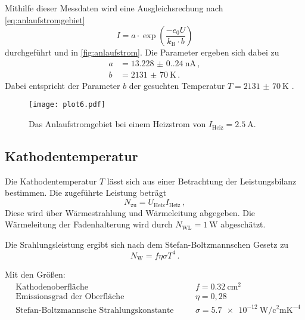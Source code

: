 Mithilfe dieser Messdaten wird eine Ausgleichsrechung nach \autoref{eq:anlaufstromgebiet}
\begin{equation}
  I=a \cdot \exp \left(\frac{-e_{0} U}{k_{\text{B}} \cdot b}\right)
\end{equation}
durchgeführt und in \autoref{fig:anlaufstrom}. Die Parameter ergeben sich dabei zu
\begin{align*}
  a &= \qty{13.228(0.240)}{\nano\ampere} \, , \\
  b &= \qty{2131(70)}{\kelvin} \, . 
\end{align*}
Dabei entspricht der Parameter $b$ der gesuchten Temperatur $T = \qty{2131(70)}{\kelvin}$ .

\begin{figure}[H]
  \centering
  \texttt{[image: plot6.pdf]}
  \caption{Das Anlaufstromgebiet bei einem Heizstrom von $I_\text{Heiz} = \qty{2,5}{\ampere}$.}
  \label{fig:anlaufstrom}
\end{figure}


\subsection{Kathodentemperatur}

Die Kathodentemperatur $T$ lässt sich aus einer Betrachtung der Leistungsbilanz bestimmen.
Die zugeführte Leistung beträgt
\begin{equation*}
  N_{\text{zu}}=U_{\text{Heiz}} I_{\text{Heiz}} \, ,
\end{equation*}
Diese wird über Wärmestrahlung und Wärmeleitung abgegeben. 
Die Wärmeleitung der Fadenhalterung wird durch $N_{\text{WL}} = \qty{1}{\watt}$ abgeschätzt. 

Die Srahlungsleistung ergibt sich nach dem Stefan-Boltzmannschen Gesetz zu
\begin{equation*}
  N_{\mathrm{W}}=f \eta \sigma T^{4} \, .
\end{equation*}

Mit den Größen:
\begin{align*}
  & \text{Kathodenoberfläche} & \quad & f = \qty{0.32}{\centi\meter\squared} \\
  & \text{Emissionsgrad der Oberfläche} & \quad & \eta=0,28 \\
  & \text{Stefan-Boltzmannsche Strahlungskonstante} & \quad & \sigma = \qty{5.7e-12}{\watt\per\square\centi\meter\kelvin\tothe{-4}} 
\end{align*}

